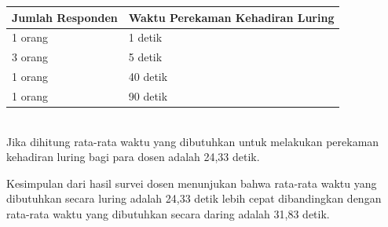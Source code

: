 \begin{enumerate}
\begin{table}[ht]
\begin{tabular}{|p{4cm} |p{7cm}|}
			\hline
			Jumlah Responden &  Waktu Perekaman Kehadiran Luring \\ \hline     
			1 orang &  1 detik\\ \hline 
			3 orang &  5 detik\\ \hline 
			1 orang &  40 detik\\ \hline 
			1 orang &  90 detik\\ \hline 
		\end{tabular}
		\label{tab:luringDosen}
	\end{table}\\
	Jika dihitung rata-rata waktu yang dibutuhkan untuk melakukan perekaman kehadiran luring bagi para dosen adalah 24,33 detik.
\end{enumerate}
Kesimpulan dari hasil survei dosen menunjukan bahwa rata-rata waktu yang dibutuhkan secara luring adalah 24,33 detik lebih cepat dibandingkan dengan rata-rata waktu yang dibutuhkan secara daring adalah 31,83 detik.
\newpage
